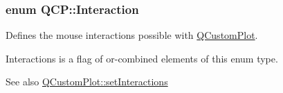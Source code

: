 \subsubsection[{\texorpdfstring{Interaction}{Interaction}}]{\setlength{\rightskip}{0pt plus 5cm}enum {\bf Q\+C\+P\+::\+Interaction}}\hypertarget{namespace_q_c_p_a2ad6bb6281c7c2d593d4277b44c2b037}{}\label{namespace_q_c_p_a2ad6bb6281c7c2d593d4277b44c2b037}
Defines the mouse interactions possible with \hyperlink{class_q_custom_plot}{Q\+Custom\+Plot}.

{\ttfamily Interactions} is a flag of or-\/combined elements of this enum type.

\begin{DoxySeeAlso}{See also}
\hyperlink{class_q_custom_plot_a5ee1e2f6ae27419deca53e75907c27e5}{Q\+Custom\+Plot\+::set\+Interactions} 
\end{DoxySeeAlso}
